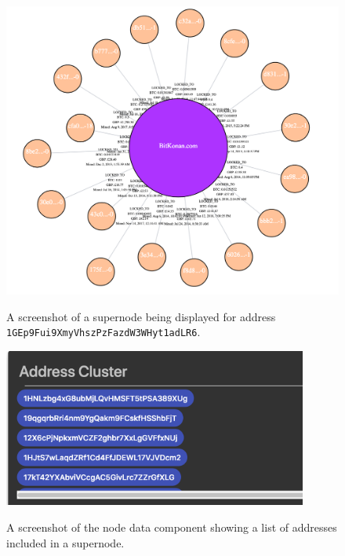 \begin{figure}[h!]
  \centering
  \includegraphics[width = 15cm]{./figures/ui-screenshots/entity-tagging-supernode}\\[0.5cm] 
  \caption{A screenshot of a supernode being displayed for address \texttt{1GEp9Fui9XmyVhszPzFazdW3WHyt1adLR6}.}
  \label{fig:entity-tagging-supernode}
\end{figure}

\begin{figure}[h!]
  \centering
  \includegraphics[width = 10cm]{./figures/ui-screenshots/supernode-address-list}\\[0.5cm] 
  \caption{A screenshot of the node data component showing a list of addresses included in a supernode.}
  \label{fig:entity-tagging-supernode-address-list}
\end{figure}

